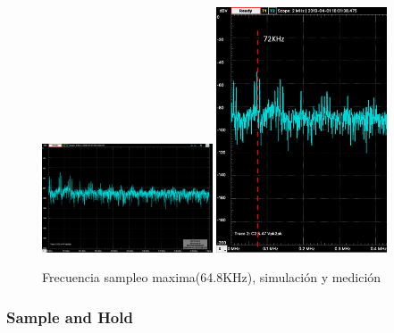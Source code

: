 \documentclass[../../ASSD_TP1_G7.tex]{subfiles}
\begin{document}
\begin{figure}[H]
\centering
{}
{\includegraphics[width=0.45\textwidth]{figures/simpto_8_llave_64,8khz_espectro.png}}
{\includegraphics[width=0.45\textwidth]{figures/pto_8_llave_64,8khz_espectro.png}}
\caption{Frecuencia sampleo maxima(64.8KHz), simulación y medición}
\end{figure}


\subsubsection{Sample and Hold}
\end{document}
